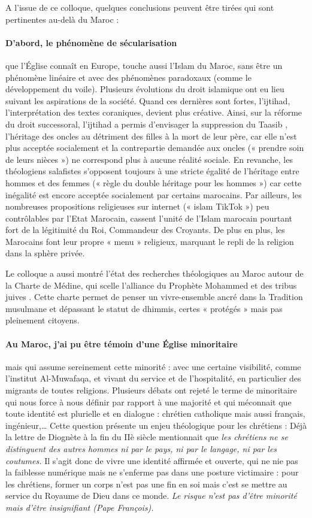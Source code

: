 A l’issue de ce colloque, quelques conclusions peuvent être tirées qui sont pertinentes au-delà du Maroc :
\paragraph{D’abord, le phénomène de sécularisation}
 que l’Église connaît en Europe, touche aussi l’Islam du Maroc, sans être un phénomène linéaire et avec des phénomènes paradoxaux (comme le développement du voile). Plusieurs évolutions du droit islamique ont eu lieu suivant les aspirations de la société. Quand ces dernières sont fortes, l’ijtihad, l’interprétation des textes coraniques, devient plus créative. Ainsi, sur la réforme du droit successoral, l’ijtihad a permis d’envisager la suppression du Taasib \label{Def:Taasib}, l’héritage des oncles au détriment des filles à la mort de leur père, car elle n’est plus acceptée socialement et la contrepartie demandée aux oncles (« prendre soin de leurs nièces ») ne correspond plus à aucune réalité sociale. En revanche, les théologiens salafistes s’opposent toujours à une stricte égalité de l’héritage entre hommes et des femmes (« règle du double héritage pour les hommes ») car cette inégalité est encore acceptée socialement par certains marocains. Par ailleurs, les nombreuses propositions religieuses sur internet (« islam TikTok ») peu contrôlables par l’Etat Marocain, cassent l’unité de l’Islam marocain pourtant fort de la légitimité du Roi, Commandeur des Croyants.  De plus en plus, les Marocains font leur propre « menu » religieux, marquant le repli de la religion dans la sphère privée. 

Le colloque a aussi montré l’état des recherches théologiques au Maroc autour de la Charte de Médine, qui scelle l’alliance du Prophète Mohammed et des tribus juives . Cette charte permet de penser un vivre-ensemble ancré dans la Tradition musulmane et dépassant le statut de dhimmis, certes « protégés » mais pas pleinement citoyens. 
\paragraph{Au Maroc, j’ai pu être témoin d’une Église minoritaire}
 mais qui assume sereinement cette minorité : avec une certaine visibilité, comme l’institut Al-Muwafaqa, et vivant du service et de l’hospitalité, en particulier des migrants de toutes religions.  Plusieurs débats ont rejeté le terme de  minoritaire  qui nous force à nous définir par rapport à une majorité et qui méconnait que toute identité est plurielle et en dialogue : chrétien catholique mais aussi français, ingénieur,… Cette question présente un enjeu théologique pour les chrétiens : Déjà la lettre de Diognète à la fin du IIè siècle  mentionnait que \textit{les chrétiens ne se distinguent des autres hommes ni par le pays, ni par le langage, ni par les coutumes.} Il s’agit donc de vivre une identité affirmée et ouverte, qui ne nie pas la faiblesse numérique mais ne s’enferme pas dans une posture victimaire : pour les chrétiens, former un corps n’est pas une fin en soi mais c’est se mettre au service du Royaume de Dieu dans ce monde. \textit{Le risque n’est pas d’être minorité mais d’être insignifiant (Pape François).}

